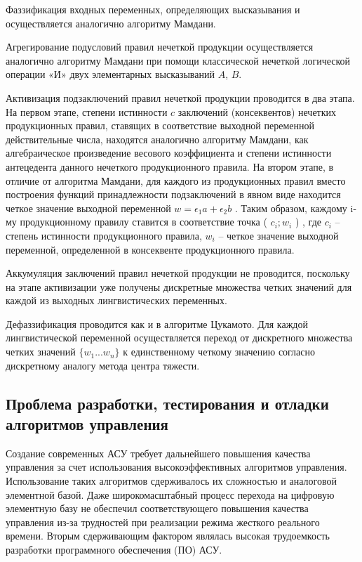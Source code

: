 Фаззификация входных переменных, определяющих высказывания и осуществляется аналогично алгоритму Мамдани.

Агрегирование подусловий правил нечеткой продукции осуществляется аналогично алгоритму Мамдани при помощи классической нечеткой логической операции «И» двух элементарных высказываний $A$, $B$.

Активизация подзаключений правил нечеткой продукции проводится в два этапа. На первом этапе, степени истинности $c$ заключений (консеквентов) нечетких продукционных правил, ставящих в соответствие выходной переменной действительные числа, находятся аналогично алгоритму Мамдани, как алгебраическое произведение весового коэффициента и степени истинности антецедента данного нечеткого продукционного правила. На втором этапе, в отличие от алгоритма Мамдани, для каждого из продукционных правил вместо построения функций принадлежности подзаключений в явном виде находится четкое значение выходной переменной $w= \epsilon_1 a+ \epsilon_2 b$ . Таким образом, каждому i-му продукционному правилу ставится в соответствие точка ( $c_i; w_i$ ) , где $c_i$ – степень истинности продукционного правила, $w_i$ – четкое значение выходной переменной, определенной в консеквенте продукционного правила.

Аккумуляция заключений правил нечеткой продукции не проводится, поскольку на этапе активизации уже получены дискретные множества четких значений для каждой из выходных лингвистических переменных.

Дефаззификация проводится как и в алгоритме Цукамото. Для каждой лингвистической переменной осуществляется переход от дискретного множества четких значений $\{w_1...w_n\}$ к единственному четкому значению согласно дискретному аналогу метода центра тяжести.


\subsection{Проблема разработки, тестирования и отладки алгоритмов управления}
\label{sec:domain:4}

Создание современных АСУ требует дальнейшего повышения качества управления за счет использования высокоэффективных алгоритмов управления. Использование таких алгоритмов сдерживалось их сложностью и аналоговой элементной базой. Даже широкомасштабный процесс перехода на цифровую элементную базу не обеспечил соответствующего повышения качества управления из-за трудностей при реализации режима жесткого реального времени. Вторым сдерживающим фактором являлась высокая трудоемкость разработки программного обеспечения (ПО) АСУ.

